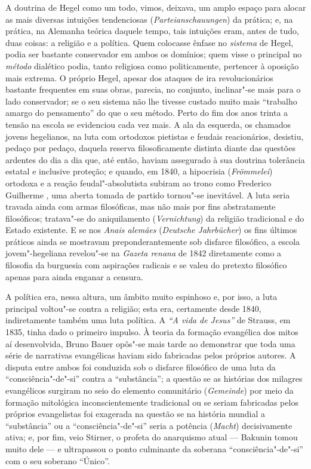A doutrina
de Hegel como
um todo, vimos, deixava, um amplo espaço para alocar as mais diversas
intuições tendenciosas (\emph{Parteianschauungen}) da prática; e, na
prática, na Alemanha teórica daquele tempo, tais intuições eram, antes
de tudo, duas coisas: a religião e a política. Quem colocasse ênfase
no \emph{sistema }de Hegel,
podia ser bastante conservador em ambos os domínios; quem visse o
principal no \emph{método }dialético podia, tanto religiosa como
politicamente, pertencer à oposição mais extrema. O
próprio Hegel,
apesar dos ataques de ira revolucionários bastante frequentes em suas
obras, parecia, no conjunto, inclinar"-se mais para o lado conservador;
se o seu sistema não lhe tivesse custado muito mais ``trabalho amargo do
pensamento'' do que o seu método. Perto do fim dos anos trinta a tensão
na escola se evidenciou cada vez mais. A ala da esquerda, os chamados
jovens hegelianos, na luta com ortodoxos pietistas e feudais
reacionários, desistiu, pedaço por pedaço, daquela reserva
filosoficamente distinta diante das questões ardentes do dia a dia que,
até então, haviam assegurado à sua doutrina tolerância estatal e
inclusive proteção; e quando, em 1840, a hipocrisia (\emph{Frömmelei})
ortodoxa e a reação feudal"-absolutista subiram ao trono como Frederico
Guilherme , uma aberta tomada de partido tornou"-se inevitável. A luta
seria travada ainda com armas filosóficas, mas não mais por fins
abstratamente filosóficos; tratava"-se do aniquilamento
(\emph{Vernichtung}) da religião tradicional e do Estado existente. E se
nos \emph{Anais alemães}
(\emph{Deutsche Jahrbücher}) os fins últimos práticos ainda se mostravam
preponderantemente sob disfarce filosófico, a escola jovem"-hegeliana
revelou"-se na \emph{Gazeta renana }de 1842 diretamente como a filosofia
da burguesia com aspirações radicais e se valeu do pretexto filosófico
apenas para ainda enganar a censura.

A política era, nessa altura, um âmbito muito espinhoso e, por isso, a
luta principal voltou"-se contra a religião; esta era, certamente desde
1840, indiretamente também uma luta política.
A \emph{``A vida de Jesus''} de Strauss,
em 1835, tinha dado o primeiro impulso. À teoria da formação evangélica
dos mitos aí desenvolvida,
Bruno Bauer opôs"-se mais tarde ao demonstrar que toda uma série de narrativas
evangélicas haviam sido fabricadas pelos próprios autores. A disputa
entre ambos foi conduzida sob o disfarce filosófico de uma luta da
``consciência"-de"-si'' contra a ``substância''; a questão se as histórias
dos milagres evangélicos surgiram no seio do elemento comunitário
(\emph{Gemeinde}) por meio da formação mitológica inconscientemente
tradicional ou se seriam fabricadas pelos próprios evangelistas foi
exagerada na questão se na história mundial a ``substância'' ou a
``consciência"-de"-si'' seria a potência (\emph{Macht}) decisivamente
ativa; e, por fim, veio Stirner,
o profeta do anarquismo atual --- Bakunin tomou muito dele --- e ultrapassou
o ponto culminante da soberana ``consciência"-de"-si'' com o seu soberano
``Único''.


